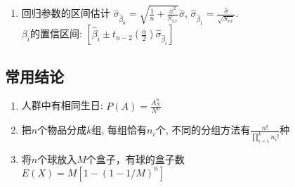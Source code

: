 \documentclass[10pt,a4paper,nofonts]{ctexart}
\newcommand{\D}{\displaystyle}
\begin{document}
\begin{multicols}{2}
\begin{enumerate}
\item 回归参数的区间估计
$\hat\sigma_{\hat\beta_0}=\sqrt{\frac{1}{n}+\frac{\bar x^2}{S_{xx}}}\hat\sigma$,
$\hat\sigma_{\hat\beta_1}=\frac{\hat\sigma}{\sqrt{S_{xx}}}$.\\
$\beta_i$的置信区间: $[\hat\beta_i\pm t_{n-2}(\frac{\alpha}{2})\hat\sigma_{\hat\beta_i}]$

\end{enumerate}

\subsection*{常用结论}

\begin{enumerate}
\item 人群中有相同生日: $\D P(A)=\frac{A_N^n}{N^n}$

\item 把$n$个物品分成$k$组, 每组恰有$n_i$个, 不同的分组方法有$\D\frac{n!}{\prod_{i=1}^{k}n_i!}$种

\item 将$n$个球放入$M$个盒子，有球的盒子数\\$E(X)=M\left[1-(1-1/M)^n\right]$


\end{enumerate}
\end{multicols}
\end{document}
